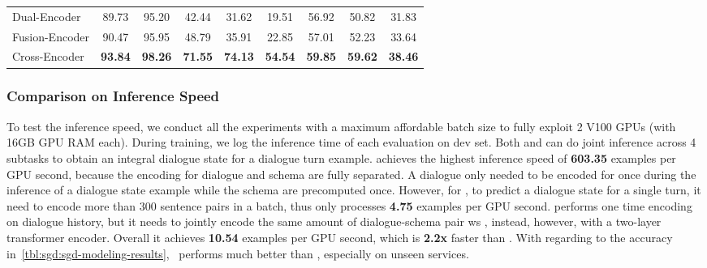 \begin{table}[!tbp]
\begin{center}
{\begin{tabular}{l|ccccc|ccc}
  Dual-Encoder                 & 89.73                      & 95.20       & 42.44                          & 31.62       & 19.51       & 56.92       & 50.82       & 31.83       \\
  Fusion-Encoder               & 90.47                      & 95.95       & 48.79                          & 35.91       & 22.85       & 57.01       & 52.23       & 33.64       \\
  Cross-Encoder                & {\bf 93.84}                & {\bf 98.26} & {\bf 71.55}                    & {\bf 74.13} & {\bf 54.54} & {\bf 59.85} & {\bf 59.62} & {\bf 38.46} \\ \hline
  \bottomrule
\end{tabular}}
\end{center}
\end{table}

\subsubsection{Comparison on Inference Speed}
\label{sssec:sgd:infer-speed}
To test the inference speed, we conduct all the experiments with a
maximum affordable batch size to fully exploit 2 V100 GPUs (with 16GB
GPU RAM each). During training, we log the inference time of each
evaluation on dev set. Both \DE and \FE can do joint inference across
4 subtasks to obtain an integral dialogue state for a dialogue turn
example. \DE achieves the highest inference speed of {\bf 603.35}
examples per GPU second, because the encoding for dialogue and schema
are fully separated. A dialogue only needed to be encoded for once
during the inference of a dialogue state example while the schema are
precomputed once. However, for \CE, to predict a dialogue state for a
single turn, it need to encode more than 300 sentence pairs in a
batch, thus only processes {\bf 4.75} examples per GPU second. \FE
performs one time encoding on dialogue history, but it needs to jointly
encode the same amount of dialogue-schema pair ws \CE, instead, however,
with a two-layer transformer encoder. Overall it achieves {\bf 10.54}
examples per GPU second, which is {\bf 2.2x} faster than \CE. With
regarding to the accuracy in~\autoref{tbl:sgd:sgd-modeling-results},
\FE~performs much better than \DE, especially on unseen services.

